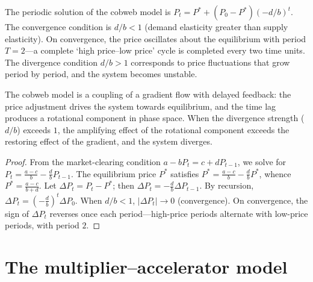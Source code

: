 \begin{proposition}\label{prop:cobweb_convergence}
The periodic solution of the cobweb model is $P_t = P^* + (P_0 - P^*)(-d/b)^t$. The convergence condition is $d/b < 1$ (demand elasticity greater than supply elasticity). On convergence, the price oscillates about the equilibrium with period $T = 2$---a complete `high price--low price' cycle is completed every two time units. The divergence condition $d/b > 1$ corresponds to price fluctuations that grow period by period, and the system becomes unstable.

The cobweb model is a coupling of a gradient flow with delayed feedback: the price adjustment drives the system towards equilibrium, and the time lag produces a rotational component in phase space. When the divergence strength ($d/b$) exceeds $1$, the amplifying effect of the rotational component exceeds the restoring effect of the gradient, and the system diverges.
\end{proposition}

\begin{proof}
From the market-clearing condition $a - bP_t = c + dP_{t-1}$, we solve for $P_t = \frac{a-c}{b} - \frac{d}{b}P_{t-1}$. The equilibrium price $P^*$ satisfies $P^* = \frac{a-c}{b} - \frac{d}{b}P^*$, whence $P^* = \frac{a-c}{b+d}$. Let $\Delta P_t = P_t - P^*$; then $\Delta P_t = -\frac{d}{b}\Delta P_{t-1}$. By recursion, $\Delta P_t = (-\frac{d}{b})^t \Delta P_0$. When $d/b < 1$, $|\Delta P_t| \to 0$ (convergence). On convergence, the sign of $\Delta P_t$ reverses once each period---high-price periods alternate with low-price periods, with period $2$.
\end{proof}

\section{The multiplier--accelerator model}

